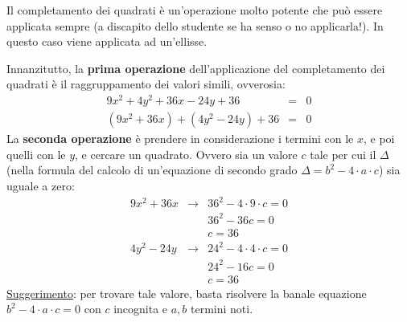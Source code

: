 \documentclass[a4paper]{article}
\begin{document}
	Il completamento dei quadrati è un'operazione molto potente che può essere applicata sempre (a discapito dello studente se ha senso o no applicarla!). In questo caso viene applicata ad un'ellisse.\newline
	
	\noindent
	Innanzitutto, la \textbf{prima operazione} dell'applicazione del completamento dei quadrati è il raggruppamento dei valori simili, ovverosia:
	\begin{equation*}
		\begin{array}{rcl}
			9x^{2} + 4y^{2} + 36x - 24y + 36 &=& 0 \\
			\left(9x^{2} + 36x\right) + \left(4y^{2} - 24y\right) + 36 &=& 0
		\end{array}
	\end{equation*}
	La \textbf{seconda operazione} è prendere in considerazione i termini con le $x$, e poi quelli con le $y$, e cercare un quadrato. Ovvero sia un valore $c$ tale per cui il $\Delta$ (nella formula del calcolo di un'equazione di secondo grado $\Delta = b^{2} - 4 \cdot a \cdot c$) sia uguale a zero:
	\begin{equation*}
		\begin{array}{rcl}
			9x^{2} + 36x &\longrightarrow& 36^{2} - 4 \cdot 9 \cdot c = 0 \\
			&& 36^{2} - 36c = 0 \\
			&& c = 36 \\ [1em]
			4y^{2} - 24y &\longrightarrow& 24^{2} - 4 \cdot 4 \cdot c = 0 \\
			&& 24^{2} - 16c = 0 \\
			&& c = 36
		\end{array}
	\end{equation*}
	\underline{Suggerimento}: per trovare tale valore, basta risolvere la banale equazione $b^{2} - 4 \cdot a \cdot c = 0$ con $c$ incognita e $a,b$ termini noti.\newline
	
\end{document}
